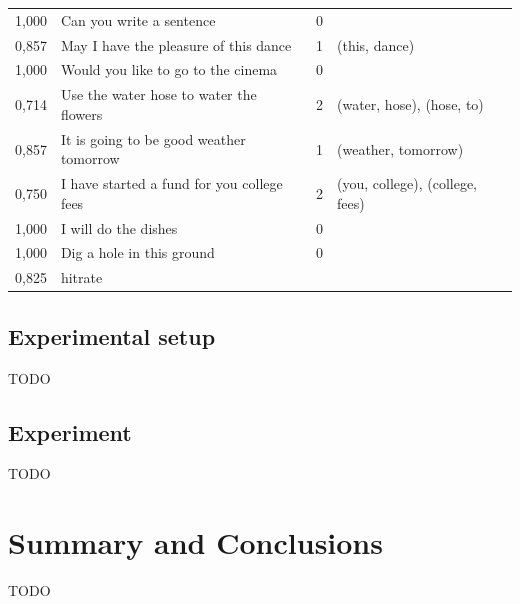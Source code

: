 \documentclass[a4paper,12pt]{article}
\begin{document}
\begin{landscape}
\begin{longtable}{l l r l}
1,000 & Can you write a sentence & 0 &  \\
0,857 & May I have the pleasure of this dance & 1 & (this, dance) \\
1,000 & Would you like to go to the cinema & 0 &  \\
0,714 & Use the water hose to water the flowers & 2 & (water, hose), (hose, to) \\
0,857 & It is going to be good weather tomorrow & 1 & (weather, tomorrow) \\
0,750 & I have started a fund for you college fees & 2 & (you, college), (college, fees) \\
1,000 & I will do the dishes & 0 &  \\
1,000 & Dig a hole in this ground & 0 &  \\
\hline
0,825 & hitrate
\label{tab:resultcorrect}
\end{longtable}
\end{landscape}

\subsection{Experimental setup}
TODO

\subsection{Experiment}
TODO

\section{Summary and Conclusions}
\label{sec:summary}
TODO




\end{document}
